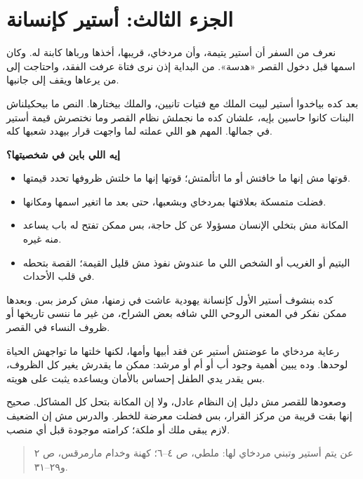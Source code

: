 \documentclass[12pt,a4paper]{article}
\begin{document}
\section*{الجزء الثالث: أستير كإنسانة}
نعرف من السفر أن أستير يتيمة، وأن مردخاي، قريبها، أخذها ورباها كابنة له. وكان اسمها قبل دخول القصر «هدسة». من البداية إذن نرى فتاة عرفت الفقد، واحتاجت إلى من يرعاها ويقف إلى جانبها.\par\medskip
بعد كده بياخدوا أستير لبيت الملك مع فتيات تانيين، والملك بيختارها. النص ما بيحكيلناش البنات كانوا حاسين بإيه، علشان كده ما نجملش نظام القصر وما نختصرش قيمة أستير في جمالها. المهم هو اللي عملته لما واجهت قرار بيهدد شعبها كله.\par\medskip
\vspace{0.2em}\noindent\textcolor{ochre}{\textbf{إيه اللي باين في شخصيتها؟}}\par\smallskip
\begin{itemize}[rightmargin=1.2em,leftmargin=0.5em,itemsep=0.25em,topsep=0.2em]
\item قوتها مش إنها ما خافتش أو ما اتألمتش؛ قوتها إنها ما خلتش ظروفها تحدد قيمتها.
\item فضلت متمسكة بعلاقتها بمردخاي وبشعبها، حتى بعد ما اتغير اسمها ومكانها.
\item المكانة مش بتخلي الإنسان مسؤولا عن كل حاجة، بس ممكن تفتح له باب يساعد منه غيره.
\item اليتيم أو الغريب أو الشخص اللي ما عندوش نفوذ مش قليل القيمة؛ القصة بتحطه في قلب الأحداث.
\end{itemize}\medskip
كده بنشوف أستير الأول كإنسانة يهودية عاشت في زمنها، مش كرمز بس. وبعدها ممكن نفكر في المعنى الروحي اللي شافه بعض الشراح، من غير ما ننسى تاريخها أو ظروف النساء في القصر.\par\medskip
رعاية مردخاي ما عوضتش أستير عن فقد أبيها وأمها، لكنها خلتها ما تواجهش الحياة لوحدها. وده يبين أهمية وجود أب أو أم أو مرشد: ممكن ما يقدرش يغير كل الظروف، بس يقدر يدي الطفل إحساس بالأمان ويساعده يثبت على هويته.\par\medskip
وصعودها للقصر مش دليل إن النظام عادل، ولا إن المكانة بتحل كل المشاكل. صحيح إنها بقت قريبة من مركز القرار، بس فضلت معرضة للخطر. والدرس مش إن الضعيف لازم يبقى ملك أو ملكة؛ كرامته موجودة قبل أي منصب.\par\medskip
\begin{quote}\small\color{muted}عن يتم أستير وتبني مردخاي لها: ملطي، ص ٤–٦؛ كهنة وخدام مارمرقس، ص ٢ و٢٩–٣١.\end{quote}
\clearpage
\clearpage
\end{document}
